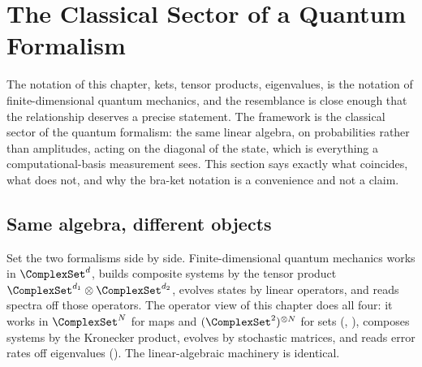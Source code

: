 %

\section{The Classical Sector of a Quantum Formalism}
\label{sec:operator-classical-sector}

The notation of this chapter, kets, tensor products, eigenvalues, is the
notation of finite-dimensional quantum mechanics, and the resemblance is close
enough that the relationship deserves a precise statement. The framework is the
classical sector of the quantum formalism: the same linear algebra, on
probabilities rather than amplitudes, acting on the diagonal of the state,
which is everything a computational-basis measurement sees.
This section says exactly what coincides, what does not, and why the bra-ket
notation is a convenience and not a claim.

\subsection*{Same algebra, different objects}

Set the two formalisms side by side. Finite-dimensional quantum mechanics works
in $\ComplexSet^{d}$, builds composite systems by the tensor product
$\ComplexSet^{d_1} \otimes \ComplexSet^{d_2}$, evolves states by linear
operators, and reads spectra off those operators. The operator view of this
chapter does all four: it works in $\ComplexSet^{N}$ for maps and
$(\ComplexSet^{2})^{\otimes N}$ for sets
(, ),
composes systems by the Kronecker product, evolves by stochastic matrices, and
reads error rates off eigenvalues (). The
linear-algebraic machinery is identical.

